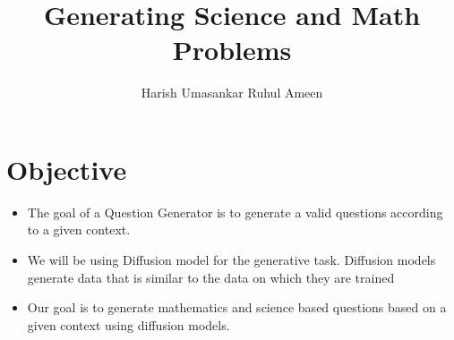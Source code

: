\documentclass[
11pt,notheorems,hyperref={pdfauthor=whatever}
]{beamer}
\title[
]{Generating Science and Math Problems}
\author[
]{
    Harish Umasankar 
    \newline
    Ruhul Ameen
}
\institute{
    Guide: Pawan Kumar
    \newline
    Panelists: Shantanav Chakraborty, Indranil Chakrabarty
}
\date{}
\begin{document}
\begin{Large}

{
\begin{frame}
  \titlepage
\end{frame}
}
\addtocounter{framenumber}{-1}





\section{Objective}
\begin{frame}
\begin{itemize}
    

    \item The goal of a Question Generator is to generate a valid questions according to a given context.

    \item We will be using Diffusion model for the generative task. Diffusion models generate data that is similar to the data on which they are trained

    \item Our goal is to generate mathematics and science based questions based on a given context using diffusion models.
    

\end{itemize}
\end{frame}
\end{Large}
\end{document}
